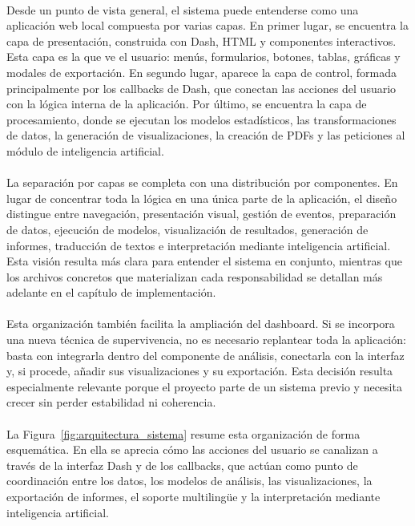 \paragraph*{}
Desde un punto de vista general, el sistema puede entenderse como una aplicación web local compuesta por varias capas. En primer lugar, se encuentra la capa de presentación, construida con Dash, HTML y componentes interactivos. Esta capa es la que ve el usuario: menús, formularios, botones, tablas, gráficas y modales de exportación. En segundo lugar, aparece la capa de control, formada principalmente por los callbacks de Dash, que conectan las acciones del usuario con la lógica interna de la aplicación. Por último, se encuentra la capa de procesamiento, donde se ejecutan los modelos estadísticos, las transformaciones de datos, la generación de visualizaciones, la creación de PDFs y las peticiones al módulo de inteligencia artificial.

\paragraph*{}
La separación por capas se completa con una distribución por componentes. En lugar de concentrar toda la lógica en una única parte de la aplicación, el diseño distingue entre navegación, presentación visual, gestión de eventos, preparación de datos, ejecución de modelos, visualización de resultados, generación de informes, traducción de textos e interpretación mediante inteligencia artificial. Esta visión resulta más clara para entender el sistema en conjunto, mientras que los archivos concretos que materializan cada responsabilidad se detallan más adelante en el capítulo de implementación.

\paragraph*{}
Esta organización también facilita la ampliación del dashboard. Si se incorpora una nueva técnica de supervivencia, no es necesario replantear toda la aplicación: basta con integrarla dentro del componente de análisis, conectarla con la interfaz y, si procede, añadir sus visualizaciones y su exportación. Esta decisión resulta especialmente relevante porque el proyecto parte de un sistema previo y necesita crecer sin perder estabilidad ni coherencia.

\paragraph*{}
La Figura~\ref{fig:arquitectura_sistema} resume esta organización de forma esquemática. En ella se aprecia cómo las acciones del usuario se canalizan a través de la interfaz Dash y de los callbacks, que actúan como punto de coordinación entre los datos, los modelos de análisis, las visualizaciones, la exportación de informes, el soporte multilingüe y la interpretación mediante inteligencia artificial.

